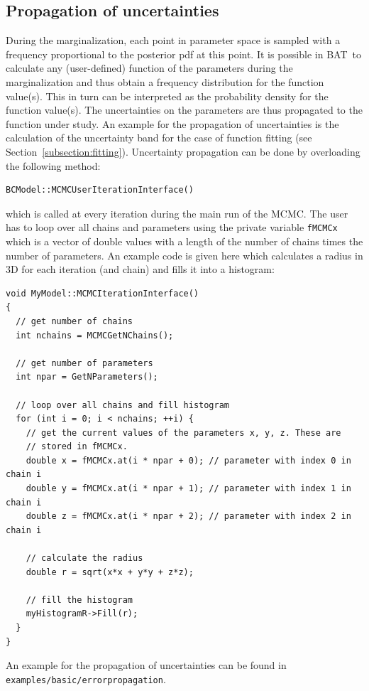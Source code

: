 \documentclass[11pt, a4paper]{article}
\newcommand{\bat}{{\sc BAT}}
\begin{document}
\subsection{Propagation of uncertainties}

During the marginalization, each point in parameter space is sampled
with a frequency proportional to the posterior pdf at this point. It
is possible in \bat\ to calculate any (user-defined) function of the
parameters during the marginalization and thus obtain a frequency
distribution for the function value(s). This in turn can be
interpreted as the probability density for the function value(s). The
uncertainties on the parameters are thus propagated to the function
under study. An example for the propagation of uncertainties is the
calculation of the uncertainty band for the case of function fitting
(see Section~\ref{subsection:fitting}).  Uncertainty propagation can
be done by overloading the following method:
%
\begin{verbatim}
BCModel::MCMCUserIterationInterface()
\end{verbatim}
%
which is called at every iteration during the main run of the
MCMC. The user has to loop over all chains and parameters using the
private variable \verb|fMCMCx| which is a vector of double values with
a length of the number of chains times the number of parameters. An
example code is given here which calculates a radius in 3D for each
iteration (and chain) and fills it into a histogram:

\begin{verbatim}
void MyModel::MCMCIterationInterface()
{
  // get number of chains
  int nchains = MCMCGetNChains();

  // get number of parameters
  int npar = GetNParameters();

  // loop over all chains and fill histogram
  for (int i = 0; i < nchains; ++i) {
    // get the current values of the parameters x, y, z. These are
    // stored in fMCMCx.
    double x = fMCMCx.at(i * npar + 0); // parameter with index 0 in chain i
    double y = fMCMCx.at(i * npar + 1); // parameter with index 1 in chain i
    double z = fMCMCx.at(i * npar + 2); // parameter with index 2 in chain i

    // calculate the radius
    double r = sqrt(x*x + y*y + z*z); 

    // fill the histogram
    myHistogramR->Fill(r);
  }
}
\end{verbatim}

\noindent 
An example for the propagation of uncertainties can be found in
\linebreak \verb|examples/basic/errorpropagation|. 
\end{document}
